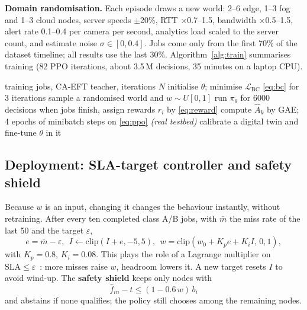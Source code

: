 \documentclass[conference]{IEEEtran}
\begin{document}
\textbf{Domain randomisation.} Each episode draws a new world: 2--6 edge, 1--3 fog and 1--3 cloud nodes, server speeds $\pm$20\%, RTT $\times$0.7--1.5, bandwidth $\times$0.5--1.5, alert rate 0.1--0.4 per camera per second, analytics load scaled to the server count, and estimate noise $\sigma\in[0,0.4]$. Jobs come only from the first 70\% of the dataset timeline; all results use the last 30\%. Algorithm~\ref{alg:train} summarises training (82 PPO iterations, about 3.5\,M decisions, 35 minutes on a laptop CPU).

\begin{algorithm}[t]
\caption{Training PACE}
\label{alg:train}
\begin{algorithmic}[1]
\REQUIRE training jobs, CA-EFT teacher, iterations $N$
\STATE initialise $\theta$; minimise $\mathcal L_{\mathrm{BC}}$ \eqref{eq:bc} for 3 iterations
    \STATE sample a randomised world and $w\sim U[0,1]$
    \STATE run $\pi_\theta$ for 6000 decisions
    \STATE when jobs finish, assign rewards $r_i$ by \eqref{eq:reward}
  \ENDFOR
  \STATE compute $\hat A_k$ by GAE; 4 epochs of minibatch steps on \eqref{eq:ppo}
\ENDFOR
\STATE \textit{(real testbed)} calibrate a digital twin and fine-tune $\theta$ in it
\end{algorithmic}
\end{algorithm}

\subsection{Deployment: SLA-target controller and safety shield}
Because $w$ is an input, changing it changes the behaviour instantly, without retraining. After every ten completed class A/B jobs, with $\bar m$ the miss rate of the last 50 and the target $\varepsilon$,
\begin{equation}
e=\bar m-\varepsilon,\ \ I\leftarrow\mathrm{clip}(I+e,-5,5),\ \ w=\mathrm{clip}(w_0+K_pe+K_iI,\,0,1), \label{eq:pi}
\end{equation}
with $K_p=0.8$, $K_i=0.08$. This plays the role of a Lagrange multiplier on $\mathrm{SLA}\le\varepsilon$~\cite{stooke2020}: more misses raise $w$, headroom lowers it. A new target resets $I$ to avoid wind-up. The \textbf{safety shield} keeps only nodes with
\begin{equation}
\hat f_{in}-t\le(1-0.6\,w)\,b_i \label{eq:shield}
\end{equation}
and abstains if none qualifies; the policy still chooses among the remaining nodes.
\end{document}
